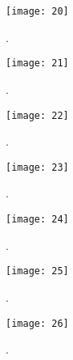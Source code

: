 \begin{figure}[H]
\centering
\texttt{[image: 20]}
\caption{.}
\end{figure}

\begin{figure}[H]
\centering
\texttt{[image: 21]}
\caption{.}
\end{figure}

\begin{figure}[H]
\centering
\texttt{[image: 22]}
\caption{.}
\end{figure}

\begin{figure}[H]
\centering
\texttt{[image: 23]}
\caption{.}
\end{figure}

\begin{figure}[H]
\centering
\texttt{[image: 24]}
\caption{.}
\end{figure}

\begin{figure}[H]
\centering
\texttt{[image: 25]}
\caption{.}
\end{figure}

\begin{figure}[H]
\centering
\texttt{[image: 26]}
\caption{.}
\end{figure}








